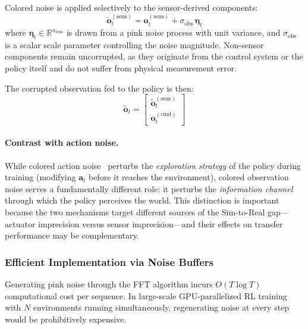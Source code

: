 Colored noise is applied selectively to the sensor-derived components:
\begin{equation}
  \tilde{\boldsymbol{o}}_t^{\mathrm{(sens)}} = \boldsymbol{o}_t^{\mathrm{(sens)}} + \sigma_{\mathrm{obs}} \, \boldsymbol{\eta}_t
  \label{eq:obs_corruption}
\end{equation}
where $\boldsymbol{\eta}_t \in \mathbb{R}^{n_{\mathrm{sens}}}$ is drawn from a pink noise process with unit variance, and $\sigma_{\mathrm{obs}}$ is a scalar scale parameter controlling the noise magnitude.
Non-sensor components remain uncorrupted, as they originate from the control system or the policy itself and do not suffer from physical measurement error.

The corrupted observation fed to the policy is then:
\begin{equation}
  \tilde{\boldsymbol{o}}_t = \begin{bmatrix} \tilde{\boldsymbol{o}}_t^{\mathrm{(sens)}} \\ \boldsymbol{o}_t^{\mathrm{(cmd)}} \end{bmatrix}
  \label{eq:corrupted_obs}
\end{equation}

\paragraph{Contrast with action noise.}
While colored action noise~\cite{eberhard2023pink} perturbs the \emph{exploration strategy} of the policy during training (modifying $\boldsymbol{a}_t$ before it reaches the environment), colored observation noise serves a fundamentally different role: it perturbs the \emph{information channel} through which the policy perceives the world.
This distinction is important because the two mechanisms target different sources of the Sim-to-Real gap---actuator imprecision versus sensor imprecision---and their effects on transfer performance may be complementary.

\subsubsection{Efficient Implementation via Noise Buffers}

Generating pink noise through the FFT algorithm incurs $O(T \log T)$ computational cost per sequence.
In large-scale GPU-parallelized RL training with $N$ environments running simultaneously, regenerating noise at every step would be prohibitively expensive.


